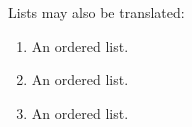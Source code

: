 Lists may also be translated:

\begin{enumerate}
  \item An ordered list.
  \item An ordered list.
  \item An ordered list.
\end{enumerate}